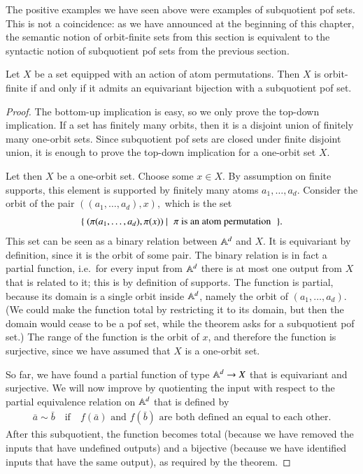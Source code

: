 The positive examples we have seen above were examples of subquotient pof sets. This is not a coincidence: as we have announced at the beginning of this chapter, the semantic notion of orbit-finite sets from this section is equivalent to the syntactic notion of subquotient pof sets from the previous section.

\begin{theorem}\label{thm:subquotiented-pof-representation} 
    Let $X$ be a set equipped with an action of atom permutations. Then $X$ is orbit-finite if and only if it admits an equivariant bijection with a subquotient pof set.
\end{theorem}
\begin{proof}
    The bottom-up implication is easy, so we only prove the top-down implication. If a set has finitely many orbits, then it is a disjoint union of finitely many one-orbit sets. Since subquotient pof sets are closed under finite disjoint union, it is enough to prove the top-down implication for a one-orbit set $X$.
    
    Let then $X$ be a one-orbit set. Choose some $x \in X$. By assumption on finite supports, this element is supported by finitely many atoms $a_1,\ldots,a_d$. Consider the orbit of the pair 
$
((a_1,\ldots,a_d),x),
$
    which is the set
    \begin{align*}
    \setbuild{(\pi(a_1,\ldots,a_d),\pi(x))}{$\pi$ is an atom permutation}.
    \end{align*}
    This set can be seen as a binary relation between $\mathbb A^d$ and $X$. It is equivariant by definition, since it is the orbit of some pair.  The binary relation is in fact a partial function, i.e.~for every input from $\mathbb A^d$  there is at most one output from $X$ that is related to it; this is by definition of supports. The function is partial, because its domain is a single orbit inside $\mathbb A^d$, namely the  orbit of $(a_1,\ldots,a_d)$. (We could make the function total by restricting it to its domain, but then the domain would cease to be a pof set, while the theorem asks for a subquotient pof set.) The range of the function is the orbit of $x$, and therefore the function is surjective, since we have assumed that $X$ is a one-orbit set.
    
    So far, we have found a partial function of type $\mathbb A^d \to X$ that is equivariant and surjective. We will now improve by quotienting the input with respect to the partial equivalence relation on $\mathbb A^d$ that is  defined by 
    \begin{align*}
    \bar a \sim \bar b
    \quad \text{if} \quad
    \text{$f(\bar a)$ and $f(\bar b)$ are both defined an equal to each other.}
    \end{align*}
    After this subquotient, the function becomes total (because we have removed the inputs that have undefined outputs) and a bijective (because we have identified inputs that have the same output), as required by the theorem. 
\end{proof}


